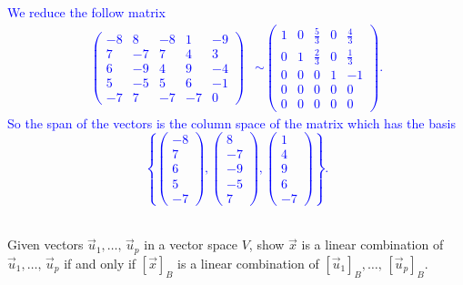 \documentclass[a4paper,11pt]{article}
\newcommand{\blue}[1]{\textcolor{blue}{#1}}
\begin{document}
\blue{We reduce the follow matrix
  \begin{align*}
    \left(
      \begin{array}{rrrrr}
        -8 & 8 & -8 & 1 & -9 \\
        7 & -7 & 7 & 4 & 3 \\
        6 & -9 & 4 & 9 & -4 \\
        5 & -5 & 5 & 6 & -1 \\
        -7 & 7 & -7 & -7 & 0
      \end{array}
    \right)
    &\sim
    \left(
      \begin{array}{rrrrr}
        1 & 0 & \frac{5}{3} & 0 & \frac{4}{3} \\
        0 & 1 & \frac{2}{3} & 0 & \frac{1}{3} \\
        0 & 0 & 0 & 1 & -1 \\
        0 & 0 & 0 & 0 & 0 \\
        0 & 0 & 0 & 0 & 0
      \end{array}
    \right).
  \end{align*}
  So the span of the vectors is the column space of the matrix which has the
  basis
  \[
    \left\{
      \left(
        \begin{array}{r}
          -8\\7\\6\\5\\-7
        \end{array}
      \right),
      \left(
        \begin{array}{r}
          8\\-7\\-9\\-5\\7
        \end{array}
      \right),
      \left(
        \begin{array}{r}
          1\\4\\9\\6\\-7
        \end{array}
      \right)
    \right\}.
  \] \\}

 Given vectors $\vec u_1, \dots,\, \vec u_p$ in a
vector space $V$, show $\vec x$ is a linear combination of $\vec u_1, \dots,\,
\vec u_p$ if and only if $[\vec x]_B$ is a linear combination of $[\vec u_1]_B,
\dots,\, [\vec u_p]_B$. \\
\end{document}
